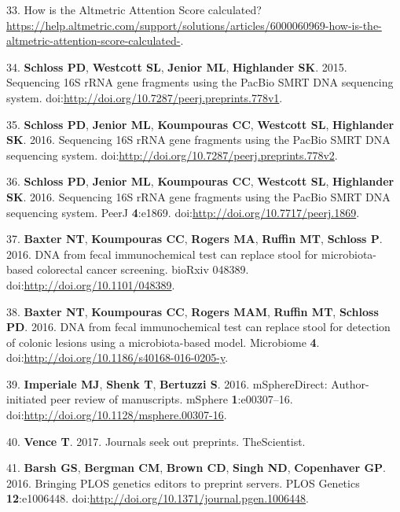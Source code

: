 \documentclass[11pt,]{article}
\begin{document}
33. How is the Altmetric Attention Score calculated?
\url{https://help.altmetric.com/support/solutions/articles/6000060969-how-is-the-altmetric-attention-score-calculated-}.

34. \textbf{Schloss PD}, \textbf{Westcott SL}, \textbf{Jenior ML},
\textbf{Highlander SK}. 2015. Sequencing 16S rRNA gene fragments using
the PacBio SMRT DNA sequencing system.
doi:\url{http://doi.org/10.7287/peerj.preprints.778v1}.

35. \textbf{Schloss PD}, \textbf{Jenior ML}, \textbf{Koumpouras CC},
\textbf{Westcott SL}, \textbf{Highlander SK}. 2016. Sequencing 16S rRNA
gene fragments using the PacBio SMRT DNA sequencing system.
doi:\url{http://doi.org/10.7287/peerj.preprints.778v2}.

36. \textbf{Schloss PD}, \textbf{Jenior ML}, \textbf{Koumpouras CC},
\textbf{Westcott SL}, \textbf{Highlander SK}. 2016. Sequencing 16S rRNA
gene fragments using the PacBio SMRT DNA sequencing system. PeerJ
\textbf{4}:e1869. doi:\url{http://doi.org/10.7717/peerj.1869}.

37. \textbf{Baxter NT}, \textbf{Koumpouras CC}, \textbf{Rogers MA},
\textbf{Ruffin MT}, \textbf{Schloss P}. 2016. DNA from fecal
immunochemical test can replace stool for microbiota-based colorectal
cancer screening. bioRxiv 048389.
doi:\url{http://doi.org/10.1101/048389}.

38. \textbf{Baxter NT}, \textbf{Koumpouras CC}, \textbf{Rogers MAM},
\textbf{Ruffin MT}, \textbf{Schloss PD}. 2016. DNA from fecal
immunochemical test can replace stool for detection of colonic lesions
using a microbiota-based model. Microbiome \textbf{4}.
doi:\url{http://doi.org/10.1186/s40168-016-0205-y}.

39. \textbf{Imperiale MJ}, \textbf{Shenk T}, \textbf{Bertuzzi S}. 2016.
mSphereDirect: Author-initiated peer review of manuscripts. mSphere
\textbf{1}:e00307--16.
doi:\url{http://doi.org/10.1128/msphere.00307-16}.

40. \textbf{Vence T}. 2017. Journals seek out preprints. TheScientist.

41. \textbf{Barsh GS}, \textbf{Bergman CM}, \textbf{Brown CD},
\textbf{Singh ND}, \textbf{Copenhaver GP}. 2016. Bringing PLOS genetics
editors to preprint servers. PLOS Genetics \textbf{12}:e1006448.
doi:\url{http://doi.org/10.1371/journal.pgen.1006448}.
\end{document}
